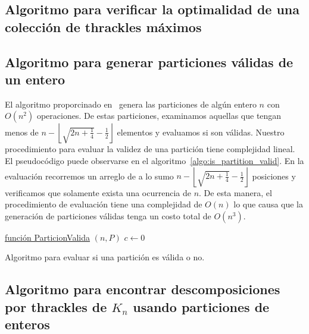   \subsection{Algoritmo para verificar la optimalidad de una colección de
  thrackles máximos}\label{secc:algoritmo_optimalidad}
\subsection{Algoritmo para generar particiones válidas de un
entero}\label{secc:algo_particiones_validas}
El algoritmo proporcinado en~\cite{Knuth2011} genera las particiones de algún entero $n$ con
$O(n^2)$ operaciones. De estas particiones, examinamos aquellas que tengan menos de $n -
\left\lfloor\sqrt{2n + \frac{1}{4}} - \frac{1}{2}\right\rfloor$ elementos y evaluamos si son
válidas.
Nuestro procedimiento para evaluar la validez de una partición tiene complejidad lineal. El
pseudocódigo puede observarse en el algoritmo~\ref{algo:is_partition_valid}. En la evaluación
recorremos un arreglo de a lo sumo $n - \left\lfloor\sqrt{2n + \frac{1}{4}} -
\frac{1}{2}\right\rfloor$ posiciones y verificamos que solamente exista una ocurrencia de $n$. De
esta manera, el procedimiento de evaluación tiene una complejidad de $O(n)$ lo que causa que la
generación de particiones válidas tenga un costo total de $O(n^3)$.

\begin{algorithm}[h]
  \DontPrintSemicolon
  \underline{función ParticionValida} $(n,P)$\;
    $c \gets 0$\;
   \caption{Algoritmo para evaluar si una partición es válida o no.}
   \label{algo:is_partition_valid}
\end{algorithm}


\subsection{Algoritmo para encontrar descomposiciones por thrackles de $K_n$
usando particiones de enteros}\label{secc:descomposiciones_particiones}
